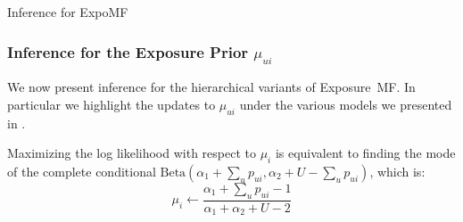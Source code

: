 \begin{algorithm}[t!]
\caption{Inference for ExpoMF}
\label{alg:exposure_mf}
\end{algorithm}

\subsubsection*{Inference for the Exposure Prior $\mu_{ui}$}
\label{sec:inf_hier_model}
We now present inference for the hierarchical variants of Exposure~MF. 
In particular we highlight the updates to 
$\mu_{ui}$ under the various models we presented in .

 Maximizing the log likelihood with respect to $\mu_i$ is equivalent to finding the mode of the complete conditional $\text{Beta}(\alpha_1 + \sum_u p_{ui}, \alpha_2 + U - \sum_u p_{ui})$, which is:
\begin{equation}\label{eq:mu_i}
\mu_i \leftarrow \frac{\alpha_1 + \sum_u p_{ui}- 1}{\alpha_1 + \alpha_2 + U - 2}
\end{equation}

